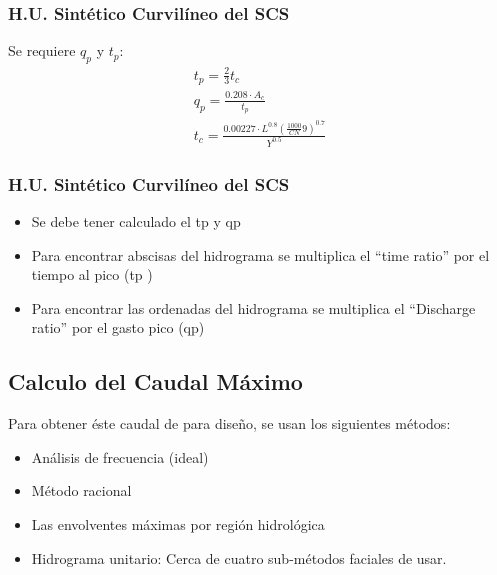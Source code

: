 \subsubsection{H.U. Sintético Curvilíneo del SCS}
Se requiere $q_p$ y $t_p$:
\begin{align}
    t_p = \frac{2}{3}t_c\\
    q_p = \frac{0.208 \cdot A_c}{t_p}\\
    t_c =\frac{0.00227 \cdot L^{0.8}\left(\frac{1000}{CN} 9\right)^{0.7}}{Y^{0.5}}
\end{align}
\subsubsection{H.U. Sintético Curvilíneo del SCS}
\begin{itemize}
    \item Se debe tener calculado el tp y qp
    \item Para encontrar abscisas del hidrograma se multiplica el “time ratio” por el tiempo al pico (tp )
    \item Para encontrar las ordenadas del hidrograma se multiplica el “Discharge ratio” por el gasto pico (qp)
\end{itemize}

\subsection{Calculo del Caudal Máximo}
Para obtener éste caudal de para diseño, se usan los siguientes métodos:
\begin{itemize}
    \item Análisis de frecuencia (ideal)
    \item Método racional
    \item Las envolventes máximas por región hidrológica
    \item Hidrograma unitario: Cerca de cuatro sub-métodos faciales de usar.
\end{itemize}
